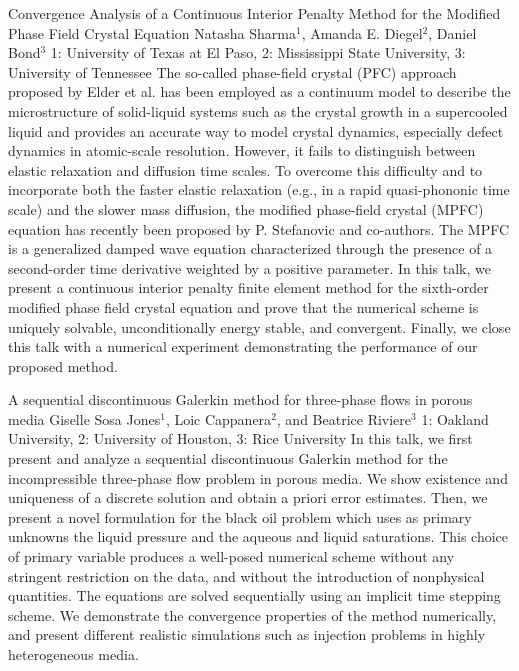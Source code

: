 \begin{addmargin}[2em]{0em}
\vspace{1.5ex}
\abs
{Convergence Analysis of a Continuous Interior Penalty Method for the Modified Phase Field Crystal Equation}
{Natasha Sharma$^{1}$, Amanda E. Diegel$^{2}$, Daniel Bond$^{3}$}
{1: University of Texas at El Paso, 2: Mississippi State University, 3: University of Tennessee}
{The so-called phase-field crystal (PFC) approach proposed by Elder et al. has been employed as a continuum model to describe the microstructure of solid-liquid systems such as the crystal growth in a supercooled liquid and provides an accurate way to model crystal dynamics, especially defect dynamics in atomic-scale resolution. However, it fails to distinguish between elastic relaxation and diffusion time scales. To overcome this difficulty and to incorporate both the faster elastic relaxation (e.g., in a rapid quasi-phononic time scale) and the slower mass diffusion, the modified phase-field crystal (MPFC) equation has recently been proposed by P. Stefanovic and co-authors. The MPFC is a generalized damped wave equation characterized through the presence of a second-order time derivative weighted by a positive parameter. In this talk, we present a continuous interior penalty finite element method for the sixth-order modified phase field crystal equation and  prove that the numerical scheme is uniquely solvable, unconditionally energy stable, and convergent. Finally, we close this talk with a numerical experiment demonstrating the performance of our proposed method.}



\vspace{1.5ex}
\abs
{A sequential discontinuous Galerkin method for three-phase flows in porous media}
{Giselle Sosa Jones$^{1}$, Loic Cappanera$^{2}$, and Beatrice Riviere$^{3}$}
{1: Oakland University, 2: University of Houston, 3: Rice University}
{In this talk, we first present and analyze a sequential discontinuous Galerkin method for the incompressible three-phase flow problem in porous media. We show existence and uniqueness of a discrete solution and obtain a priori error estimates. Then, we present a novel formulation for the black oil problem which uses as primary unknowns the liquid pressure and the aqueous and liquid saturations. This choice of primary variable produces a well-posed numerical scheme without any stringent restriction on the data, and without the introduction of nonphysical quantities. The equations are solved sequentially using an implicit time stepping scheme. We demonstrate the convergence properties of the method numerically, and present different realistic simulations such as injection problems in highly heterogeneous media.}



\end{addmargin}
